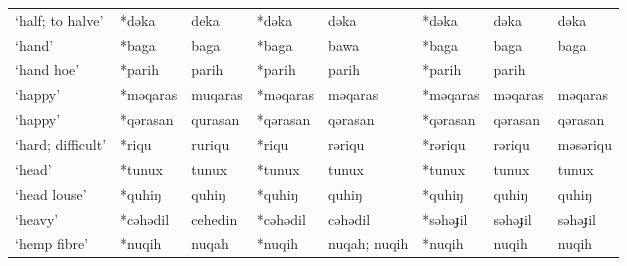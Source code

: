 \begin{landscape}
\begin{longtable}[c]{@{}p{3cm}<{\raggedright}p{2.75cm}<{\raggedright}p{2.75cm}<{\raggedright}p{2.75cm}<{\raggedright}p{2.75cm}<{\raggedright}p{2.75cm}<{\raggedright}p{2.75cm}<{\raggedright}p{2.75cm}<{\raggedright}@{}}
`half; to halve'                                     & *dəka              & deka                           & *dəka              & dəka                       & *dəka            & dəka                     & dəka                              \\
`hand'                                               & *baga              & baga                           & *baga              & bawa                       & *baga            & baga                     & baga                              \\
`hand hoe'                                           & *parih             & parih                          & *parih             & parih                      & *parih           & parih                    &                                   \\
`happy'                                              & *məqaras           & muqaras                        & *məqaras           & məqaras                    & *məqaras         & məqaras                  & məqaras                           \\
`happy'                                              & *qərasan           & qurasan                        & *qərasan           & qərasan                    & *qərasan         & qərasan                  & qərasan                           \\
`hard; difficult'                                    & *riqu              & ruriqu                         & *riqu              & rəriqu                     & *rəriqu          & rəriqu                   & məsəriqu                          \\
`head'                                               & *tunux             & tunux                          & *tunux             & tunux                      & *tunux           & tunux                    & tunux                             \\
`head louse'                                         & *quhiŋ             & quhiŋ                          & *quhiŋ             & quhiŋ                      & *quhiŋ           & quhiŋ                    & quhiŋ                             \\
`heavy'                                              & *cəhədil           & cehedin                        & *cəhədil           & cəhədil                    & *səhəɟil         & səhəɟil                  & səhəɟil                           \\
`hemp fibre'                                         & *nuqih             & nuqah                          & *nuqih             & nuqah; nuqih               & *nuqih           & nuqih                    & nuqih                             \\

\end{longtable}
\end{landscape}
